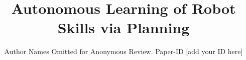 \documentclass[conference]{IEEEtran}
\begin{document}
\title{
Autonomous Learning of Robot Skills via Planning 
}

\author{Author Names Omitted for Anonymous Review. Paper-ID [add your ID here]}



\end{document}
